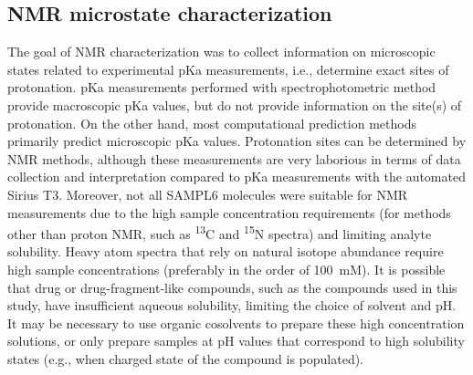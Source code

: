 \documentclass[9pt,lineno]{elife}
\begin{document}
\subsection{NMR microstate characterization}

The goal of NMR characterization was to collect information on microscopic states related to experimental pKa measurements, i.e., determine exact sites of protonation. 
pKa measurements performed with spectrophotometric method provide macroscopic pKa values, but do not provide information on the site(s) of protonation. 
On the other hand, most computational prediction methods primarily predict microscopic pKa values. 
Protonation sites can be determined by NMR methods, although these measurements are very laborious in terms of data collection and interpretation compared to pKa measurements with the automated Sirius T3. 
Moreover, not all SAMPL6 molecules were suitable for NMR measurements due to the high sample concentration requirements (for methods other than proton NMR, such as \textsuperscript{13}C and \textsuperscript{15}N spectra) and limiting analyte solubility. 
Heavy atom spectra that rely on natural isotope abundance require high sample concentrations (preferably in the order of 100~mM). It is possible that drug or drug-fragment-like compounds, such as the compounds used in this study, have insufficient aqueous solubility, limiting the choice of solvent and pH. 
It may be necessary to use organic cosolvents to prepare these high concentration solutions, or only prepare samples at pH values that correspond to high solubility states (e.g., when charged state of the compound is populated). 
\end{document}
